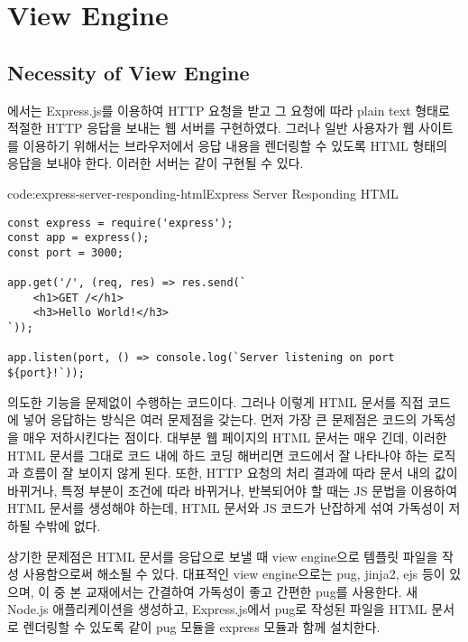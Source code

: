 \section{View Engine}\label{sect:view-engine}

\subsection*{Necessity of View Engine}

에서는 Express.js를 이용하여 HTTP 요청을 받고 그 요청에 따라 plain text 형태로 적절한 HTTP 응답을 보내는 웹 서버를 구현하였다. 그러나 일반 사용자가 웹 사이트를 이용하기 위해서는 브라우저에서 응답 내용을 렌더링할 수 있도록 HTML 형태의 응답을 보내야 한다. 이러한 서버는 \과 같이 구현될 수 있다.

\begin{codeenv}{code:express-server-responding-html}{Express Server Responding HTML}\begin{verbatim}
const express = require('express');
const app = express();
const port = 3000;

app.get('/', (req, res) => res.send(`
    <h1>GET /</h1>
    <h3>Hello World!</h3>
`));

app.listen(port, () => console.log(`Server listening on port ${port}!`));
\end{verbatim}
\end{codeenv}

\은 의도한 기능을 문제없이 수행하는 코드이다. 그러나 이렇게 HTML 문서를 직접 코드에 넣어 응답하는 방식은 여러 문제점을 갖는다. 먼저 가장 큰 문제점은 코드의 가독성을 매우 저하시킨다는 점이다. 대부분 웹 페이지의 HTML 문서는 매우 긴데, 이러한 HTML 문서를 그대로 코드 내에 하드 코딩 해버리면 코드에서 잘 나타나야 하는 로직과 흐름이 잘 보이지 않게 된다. 또한, HTTP 요청의 처리 결과에 따라 문서 내의 값이 바뀌거나, 특정 부분이 조건에 따라 바뀌거나, 반복되어야 할 때는 JS 문법을 이용하여 HTML 문서를 생성해야 하는데, HTML 문서와 JS 코드가 난잡하게 섞여 가독성이 저하될 수밖에 없다.

상기한 문제점은 HTML 문서를 응답으로 보낼 때 view engine으로 템플릿 파일을 작성 사용함으로써 해소될 수 있다. 대표적인 view engine으로는 pug, jinja2, ejs 등이 있으며, 이 중 본 교재에서는 간결하여 가독성이 좋고 간편한 pug를 사용한다. 새 Node.js 애플리케이션을 생성하고, Express.js에서 pug로 작성된 파일을 HTML 문서로 렌더링할 수 있도록 \와 같이 pug 모듈을 express 모듈과 함께 설치한다.

